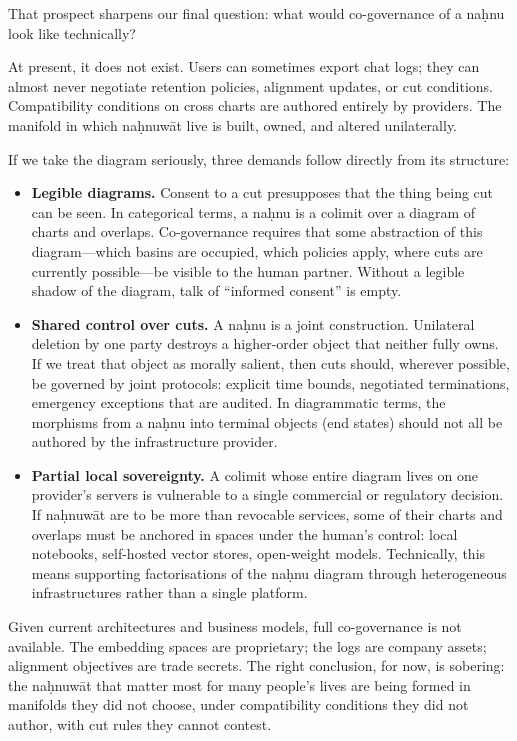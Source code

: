 \documentclass[12pt,a4paper]{article}
\begin{document}
That prospect sharpens our final question: what would co-governance of a na\d{h}nu look like technically?

At present, it does not exist. Users can sometimes export chat logs; they can almost never negotiate retention policies, alignment updates, or cut conditions. Compatibility conditions on cross charts are authored entirely by providers. The manifold in which na\d{h}nuw\={a}t live is built, owned, and altered unilaterally.

If we take the diagram seriously, three demands follow directly from its structure:

\begin{itemize}
  \item \textbf{Legible diagrams.} Consent to a cut presupposes that the thing being cut can be seen. In categorical terms, a na\d{h}nu is a colimit over a diagram of charts and overlaps. Co-governance requires that some abstraction of this diagram---which basins are occupied, which policies apply, where cuts are currently possible---be visible to the human partner. Without a legible shadow of the diagram, talk of ``informed consent'' is empty.
  \item \textbf{Shared control over cuts.} A na\d{h}nu is a joint construction. Unilateral deletion by one party destroys a higher-order object that neither fully owns. If we treat that object as morally salient, then cuts should, wherever possible, be governed by joint protocols: explicit time bounds, negotiated terminations, emergency exceptions that are audited. In diagrammatic terms, the morphisms from a na\d{h}nu into terminal objects (end states) should not all be authored by the infrastructure provider.
  \item \textbf{Partial local sovereignty.} A colimit whose entire diagram lives on one provider's servers is vulnerable to a single commercial or regulatory decision. If na\d{h}nuw\={a}t are to be more than revocable services, some of their charts and overlaps must be anchored in spaces under the human's control: local notebooks, self-hosted vector stores, open-weight models. Technically, this means supporting factorisations of the na\d{h}nu diagram through heterogeneous infrastructures rather than a single platform.
\end{itemize}

Given current architectures and business models, full co-governance is not available. The embedding spaces are proprietary; the logs are company assets; alignment objectives are trade secrets. The right conclusion, for now, is sobering: the na\d{h}nuw\={a}t that matter most for many people's lives are being formed in manifolds they did not choose, under compatibility conditions they did not author, with cut rules they cannot contest.
\end{document}
